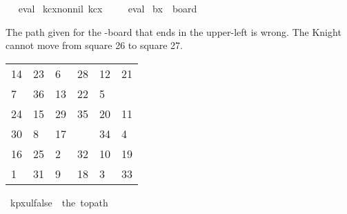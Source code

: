 \begin{isabellebody}
\isadelimproof
\ %
\endisadelimproof
%
\isatagproof
{}\isamarkupfalse%
\ eval%
\endisatagproof
{\isafoldproof}%
%
\isadelimproof
%
\endisadelimproof
\isanewline
\isanewline
{}\isamarkupfalse%
\ kc{\isacharunderscore}{\kern0pt}{}x{}{\isacharunderscore}{\kern0pt}non{\isacharunderscore}{\kern0pt}nil{\isacharcolon}{\kern0pt}\ {\isachardoublequoteopen}kc{}x{}\ {\isasymnoteq}\ {\isacharbrackleft}{\kern0pt}{\isacharbrackright}{\kern0pt}{\isachardoublequoteclose}%
\isadelimproof
\ %
\endisadelimproof
%
\isatagproof
{}\isamarkupfalse%
\ eval%
\endisatagproof
{\isafoldproof}%
%
\isadelimproof
%
\endisadelimproof
\isanewline
\isanewline
{}\isamarkupfalse%
\ {\isachardoublequoteopen}b{}x{}\ {\isasymequiv}\ board\ {}\ {}{\isachardoublequoteclose}%
\begin{isamarkuptext}%
The path given for the -board that ends in the upper-left is wrong. The Knight cannot 
move from square 26 to square 27.
  \begin{table}[H]
    \begin{tabular}{llllll}
      14 & 23 &  6 & 28 & 12 & 21 \\
       7 & 36 & 13 & 22 &  5 & \color{red}{27} \\
      24 & 15 & 29 & 35 & 20 & 11 \\
      30 &  8 & 17 & \color{red}{26} & 34 &  4 \\
      16 & 25 &  2 & 32 & 10 & 19 \\
       1 & 31 &  9 & 18 &  3 & 33
    \end{tabular}
  \end{table}%
\end{isamarkuptext}\isamarkuptrue%
\isamarkupfalse%
\ {\isachardoublequoteopen}kp{}x{}ul{\isacharunderscore}{\kern0pt}false\ {\isasymequiv}\ the\ {\isacharparenleft}{\kern0pt}to{\isacharunderscore}{\kern0pt}path\ \isanewline
\ \ {\isacharbrackleft}{\kern0pt}{\isacharbrackleft}{\kern0pt}{}{}{\isacharcomma}{\kern0pt}{}{}{\isacharcomma}{\kern0pt}{}{\isacharcomma}{\kern0pt}{}{}{\isacharcomma}{\kern0pt}{}{}{\isacharcomma}{\kern0pt}{}{}{\isacharbrackright}{\kern0pt}{\isacharcomma}{\kern0pt}\isanewline
\ \ {\isacharbrackleft}{\kern0pt}{}{\isacharcomma}{\kern0pt}{}{}{\isacharcomma}{\kern0pt}{}{}{\isacharcomma}{\kern0pt}{}{}{\isacharcomma}{\kern0pt}{}{\isacharcomma}{\kern0pt}{}{}{\isacharbrackright}{\kern0pt}{\isacharcomma}{\kern0pt}\isanewline

\end{isabellebody}

